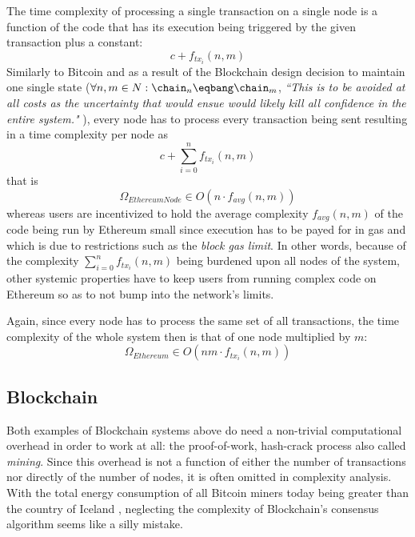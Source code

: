 \documentclass[twocolumn,showpacs,%
  nofootinbib,aps,superscriptaddress,%
  eqsecnum,prd,notitlepage,showkeys,10pt]{revtex4-1}
\begin{document}
The time complexity of processing a single transaction on a single node is a function of the code that has its execution being triggered by the given transaction plus a constant:
\begin{equation}
c+f_{tx_i}(n,m)
\end{equation}
Similarly to Bitcoin and as a result of the Blockchain design decision to maintain one single state ($\forall n,m \in N: \chain_n\eqbang\chain_m$, \textit{``This is to be avoided at all costs as the uncertainty that would ensue would likely kill all confidence in the entire system."} \cite{yellowpaper}), every node has to process every transaction being sent resulting in a time complexity per node as
\begin{equation}
c+\sum_{i=0}^n f_{tx_i}(n,m)
\end{equation}
that is
\begin{equation}
\Omega_{EthereumNode} \in O(n \cdot f_{avg}(n,m))
\end{equation}
whereas users are incentivized to hold the average complexity $f_{avg}(n,m)$
of the code being run by Ethereum small
since execution has to be payed for in gas and which is due to restrictions such as the \textit{block gas limit}.
In other words, because of the complexity $\sum_{i=0}^n f_{tx_i}(n,m)$ being burdened upon all nodes of the system, other systemic properties have to keep users from running complex code on Ethereum so as to not bump into the network's limits.

Again, since every node has to process the same set of all transactions, the time complexity of the whole system then is that of one node multiplied by $m$:
\begin{equation}
\Omega_{Ethereum} \in O(nm\cdot f_{tx_i}(n,m))
\end{equation}

\subsection{Blockchain}
\label{sec:complex:blockchain}
Both examples of Blockchain systems above do need a non-trivial computational overhead in order to work at all: the proof-of-work, hash-crack process also called \textit{mining}. Since this overhead is not a function of either the number of transactions nor directly of the number of nodes, it is often omitted in complexity analysis. With the total energy consumption of all Bitcoin miners today being greater than the country of Iceland \cite{mining-consumption}, neglecting the complexity of Blockchain's consensus algorithm seems like a silly mistake.
\end{document}
